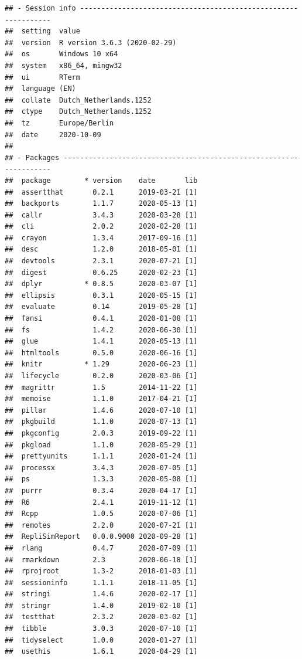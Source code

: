 \documentclass[10,a4paperpaper,]{article}
\begin{document}
\begin{verbatim}
## - Session info ---------------------------------------------------------------
##  setting  value                       
##  version  R version 3.6.3 (2020-02-29)
##  os       Windows 10 x64              
##  system   x86_64, mingw32             
##  ui       RTerm                       
##  language (EN)                        
##  collate  Dutch_Netherlands.1252      
##  ctype    Dutch_Netherlands.1252      
##  tz       Europe/Berlin               
##  date     2020-10-09                  
## 
## - Packages -------------------------------------------------------------------
##  package        * version    date       lib
##  assertthat       0.2.1      2019-03-21 [1]
##  backports        1.1.7      2020-05-13 [1]
##  callr            3.4.3      2020-03-28 [1]
##  cli              2.0.2      2020-02-28 [1]
##  crayon           1.3.4      2017-09-16 [1]
##  desc             1.2.0      2018-05-01 [1]
##  devtools         2.3.1      2020-07-21 [1]
##  digest           0.6.25     2020-02-23 [1]
##  dplyr          * 0.8.5      2020-03-07 [1]
##  ellipsis         0.3.1      2020-05-15 [1]
##  evaluate         0.14       2019-05-28 [1]
##  fansi            0.4.1      2020-01-08 [1]
##  fs               1.4.2      2020-06-30 [1]
##  glue             1.4.1      2020-05-13 [1]
##  htmltools        0.5.0      2020-06-16 [1]
##  knitr          * 1.29       2020-06-23 [1]
##  lifecycle        0.2.0      2020-03-06 [1]
##  magrittr         1.5        2014-11-22 [1]
##  memoise          1.1.0      2017-04-21 [1]
##  pillar           1.4.6      2020-07-10 [1]
##  pkgbuild         1.1.0      2020-07-13 [1]
##  pkgconfig        2.0.3      2019-09-22 [1]
##  pkgload          1.1.0      2020-05-29 [1]
##  prettyunits      1.1.1      2020-01-24 [1]
##  processx         3.4.3      2020-07-05 [1]
##  ps               1.3.3      2020-05-08 [1]
##  purrr            0.3.4      2020-04-17 [1]
##  R6               2.4.1      2019-11-12 [1]
##  Rcpp             1.0.5      2020-07-06 [1]
##  remotes          2.2.0      2020-07-21 [1]
##  RepliSimReport   0.0.0.9000 2020-09-28 [1]
##  rlang            0.4.7      2020-07-09 [1]
##  rmarkdown        2.3        2020-06-18 [1]
##  rprojroot        1.3-2      2018-01-03 [1]
##  sessioninfo      1.1.1      2018-11-05 [1]
##  stringi          1.4.6      2020-02-17 [1]
##  stringr          1.4.0      2019-02-10 [1]
##  testthat         2.3.2      2020-03-02 [1]
##  tibble           3.0.3      2020-07-10 [1]
##  tidyselect       1.0.0      2020-01-27 [1]
##  usethis          1.6.1      2020-04-29 [1]

\end{verbatim}
\end{document}
